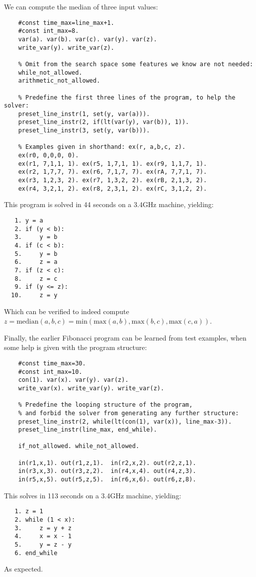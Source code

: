 \documentclass[a4paper,twoside,notitlepage]{article}
\begin{document}
We can compute the median of three input values:
\begin{verbatim}
    #const time_max=line_max+1.
    #const int_max=8.
    var(a). var(b). var(c). var(y). var(z).
    write_var(y). write_var(z).
    
    % Omit from the search space some features we know are not needed:
    while_not_allowed.
    arithmetic_not_allowed.
    
    % Predefine the first three lines of the program, to help the solver:
    preset_line_instr(1, set(y, var(a))).
    preset_line_instr(2, if(lt(var(y), var(b)), 1)).
    preset_line_instr(3, set(y, var(b))).
    
    % Examples given in shorthand: ex(r, a,b,c, z).
    ex(r0, 0,0,0, 0).
    ex(r1, 7,1,1, 1). ex(r5, 1,7,1, 1). ex(r9, 1,1,7, 1).
    ex(r2, 1,7,7, 7). ex(r6, 7,1,7, 7). ex(rA, 7,7,1, 7).
    ex(r3, 1,2,3, 2). ex(r7, 1,3,2, 2). ex(rB, 2,1,3, 2).
    ex(r4, 3,2,1, 2). ex(r8, 2,3,1, 2). ex(rC, 3,1,2, 2).
\end{verbatim}
This program is solved in 44 seconds on a 3.4GHz machine, yielding:
\begin{verbatim}
   1. y = a
   2. if (y < b):
   3.     y = b
   4. if (c < b):
   5.     y = b
   6.     z = a
   7. if (z < c):
   8.     z = c
   9. if (y <= z):
  10.     z = y
\end{verbatim}
Which can be verified to indeed compute $z = \textrm{median}(a,b,c) = 
\textrm{min}(\textrm{max}(a,b), \textrm{max}(b,c), \textrm{max}(c,a))$.

Finally, the earlier Fibonacci program can be learned from test examples, 
when some help is given with the program structure:
\begin{verbatim}
    #const time_max=30.
    #const int_max=10.
    con(1). var(x). var(y). var(z).
    write_var(x). write_var(y). write_var(z).
    
    % Predefine the looping structure of the program,
    % and forbid the solver from generating any further structure:
    preset_line_instr(2, while(lt(con(1), var(x)), line_max-3)).
    preset_line_instr(line_max, end_while).
    
    if_not_allowed. while_not_allowed.
    
    in(r1,x,1). out(r1,z,1).  in(r2,x,2). out(r2,z,1).
    in(r3,x,3). out(r3,z,2).  in(r4,x,4). out(r4,z,3).
    in(r5,x,5). out(r5,z,5).  in(r6,x,6). out(r6,z,8).
\end{verbatim}
This solves in 113 seconds on a 3.4GHz machine, yielding:
\begin{verbatim}
   1. z = 1
   2. while (1 < x):
   3.     z = y + z
   4.     x = x - 1
   5.     y = z - y
   6. end_while
\end{verbatim}
As expected.
\end{document}

